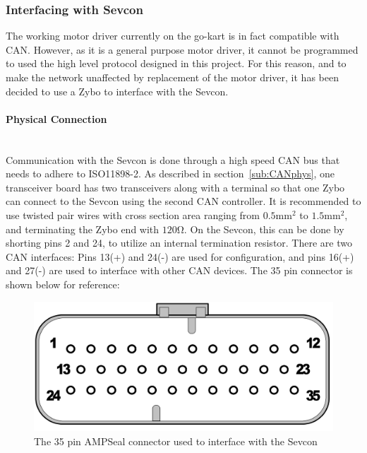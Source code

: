 

\subsubsection{Interfacing with Sevcon}\label{sub:Sevcon_interfacing}
The working motor driver currently on the go-kart is in fact compatible with CAN.
However, as it is a general purpose motor driver, it cannot be programmed to used the high level protocol designed in this project. 
For this reason, and to make the network unaffected by replacement of the motor driver, it has been decided to use a Zybo to interface with the Sevcon.

\paragraph*{Physical Connection}\label{sub:sevcon_physical_connection}~\\
Communication with the Sevcon is done through a high speed CAN bus that needs to adhere to ISO11898-2.
As described in section~\ref{sub:CANphys}, one transceiver board has two transceivers along with a terminal so that one Zybo can connect to the Sevcon using the second CAN controller.
It is recommended to use twisted pair wires with cross section area ranging from $0.5 \si{\milli \meter \squared}$ to $1.5 \si{\milli \meter \squared}$, and terminating the Zybo end with $120 \si{\ohm}$.
On the Sevcon, this can be done by shorting pins 2 and 24, to utilize an internal termination resistor.
There are two CAN interfaces: Pins 13(+) and 24(-) are used for configuration, and pins 16(+) and 27(-) are used to interface with other CAN devices.
The 35 pin connector is shown below for reference:

\begin{figure}[h]
	\centering
	\includegraphics[width = 0.6\linewidth]{graphics/35_pin_dsub}
	\caption{The 35 pin AMPSeal connector used to interface with the Sevcon}
	\label{fig:35_pin_dsub}
\end{figure}

